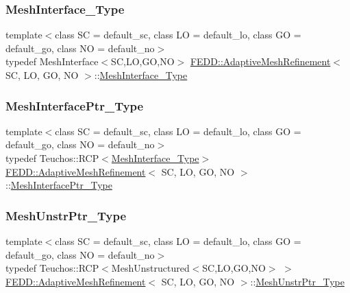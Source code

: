 \subsubsection{\texorpdfstring{Mesh\+Interface\+\_\+\+Type}{MeshInterface\_Type}}
{\footnotesize\ttfamily template$<$class SC  = default\+\_\+sc, class LO  = default\+\_\+lo, class GO  = default\+\_\+go, class NO  = default\+\_\+no$>$ \\
typedef Mesh\+Interface$<$SC,LO,GO,NO$>$ \hyperlink{classFEDD_1_1AdaptiveMeshRefinement}{F\+E\+D\+D\+::\+Adaptive\+Mesh\+Refinement}$<$ SC, LO, GO, NO $>$\+::\hyperlink{classFEDD_1_1AdaptiveMeshRefinement_a2d24dca5502ca055019d31c569bf003e}{Mesh\+Interface\+\_\+\+Type}}

\mbox{\label{classFEDD_1_1AdaptiveMeshRefinement_a5d1f62bff0822daa8f0b7caf3e3b4311}} 
\subsubsection{\texorpdfstring{Mesh\+Interface\+Ptr\+\_\+\+Type}{MeshInterfacePtr\_Type}}
{\footnotesize\ttfamily template$<$class SC  = default\+\_\+sc, class LO  = default\+\_\+lo, class GO  = default\+\_\+go, class NO  = default\+\_\+no$>$ \\
typedef Teuchos\+::\+R\+CP$<$\hyperlink{classFEDD_1_1AdaptiveMeshRefinement_a2d24dca5502ca055019d31c569bf003e}{Mesh\+Interface\+\_\+\+Type}$>$ \hyperlink{classFEDD_1_1AdaptiveMeshRefinement}{F\+E\+D\+D\+::\+Adaptive\+Mesh\+Refinement}$<$ SC, LO, GO, NO $>$\+::\hyperlink{classFEDD_1_1AdaptiveMeshRefinement_a5d1f62bff0822daa8f0b7caf3e3b4311}{Mesh\+Interface\+Ptr\+\_\+\+Type}}

\mbox{\label{classFEDD_1_1AdaptiveMeshRefinement_abc927c0c0253b094c3c53338f9128d20}} 
\subsubsection{\texorpdfstring{Mesh\+Unstr\+Ptr\+\_\+\+Type}{MeshUnstrPtr\_Type}}
{\footnotesize\ttfamily template$<$class SC  = default\+\_\+sc, class LO  = default\+\_\+lo, class GO  = default\+\_\+go, class NO  = default\+\_\+no$>$ \\
typedef Teuchos\+::\+R\+CP$<$Mesh\+Unstructured$<$SC,LO,GO,NO$>$ $>$ \hyperlink{classFEDD_1_1AdaptiveMeshRefinement}{F\+E\+D\+D\+::\+Adaptive\+Mesh\+Refinement}$<$ SC, LO, GO, NO $>$\+::\hyperlink{classFEDD_1_1AdaptiveMeshRefinement_abc927c0c0253b094c3c53338f9128d20}{Mesh\+Unstr\+Ptr\+\_\+\+Type}}


